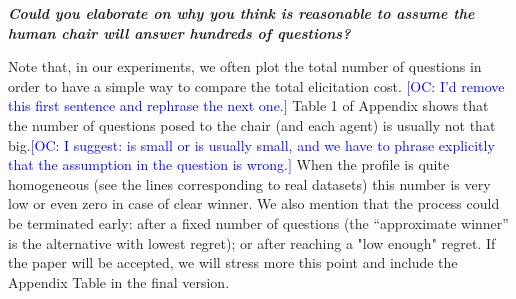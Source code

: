 \documentclass{article}
\newcommand{\commentOC}[1]{\textcolor{blue}{\small$\big[$OC: #1$\big]$}}
\begin{document}
\textit{\textbf{Could you elaborate on why you think is reasonable to assume the human chair will answer hundreds of questions?}}

Note that, in our experiments, we often plot the total number of questions in order to have a simple way to compare the total elicitation cost. 
\commentOC{I’d remove this first sentence and rephrase the next one.}
Table 1 of Appendix shows that the number of questions posed to the chair (and each agent) is usually not that big.\commentOC{I suggest: is small or is usually small, and we have to phrase explicitly that the assumption in the question is wrong.}
When the profile is quite homogeneous (see the lines corresponding to real datasets) this number is very low or even zero in case of clear winner. We also mention that the process could be terminated early: after a fixed number of questions (the “approximate winner” is the alternative with lowest regret); or after reaching a "low enough" regret.
If the paper will be accepted, we will stress more this point and include the Appendix Table in the final version.
\end{document}
